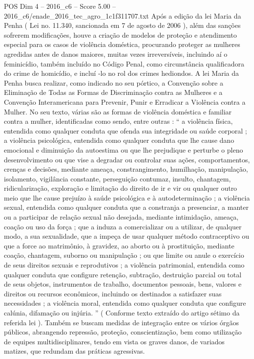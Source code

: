 \begin{textsample}{POS Dim 4 – 2016\_c6 – Score 5.00 – 2016\_c6/enade\_2016\_tec\_agro\_1c1f311707.txt}
Após a edição da lei Maria da Penha ( Lei no. 11.340, sancionada em 7 de agosto de 2006 ), além das sanções sofrerem modificações, houve a criação de modelos de proteção e atendimento especial para os casos de violência doméstica, procurando proteger as mulheres agredidas antes de danos maiores, muitas vezes irreversíveis, incluindo aí o feminicídio, também incluído no Código Penal, como circunstância qualificadora do crime de homicídio, e incluí -lo no rol dos crimes hediondos.
A lei Maria da Penha busca realizar, como indicado no seu pórtico, a Convenção sobre a Eliminação de Todas as Formas de Discriminação contra as Mulheres e a Convenção Interamericana para Prevenir, Punir e Erradicar a Violência contra a Mulher.
No seu texto, várias são as formas de violência doméstica e familiar contra a mulher, identificadas como sendo, entre outras : “ a violência física, entendida como qualquer conduta que ofenda sua integridade ou saúde corporal ; a violência psicológica, entendida como qualquer conduta que lhe cause dano emocional e diminuição da autoestima ou que lhe prejudique e perturbe o pleno desenvolvimento ou que vise a degradar ou controlar suas ações, comportamentos, crenças e decisões, mediante ameaça, constrangimento, humilhação, manipulação, isolamento, vigilância constante, perseguição contumaz, insulto, chantagem, ridicularização, exploração e limitação do direito de ir e vir ou qualquer outro meio que lhe cause prejuízo à saúde psicológica e à autodeterminação ; a violência sexual, entendida como qualquer conduta que a constranja a presenciar, a manter ou a participar de relação sexual não desejada, mediante intimidação, ameaça, coação ou uso da força ; que a induza a comercializar ou a utilizar, de qualquer modo, a sua sexualidade, que a impeça de usar qualquer método contraceptivo ou que a force ao matrimônio, à gravidez, ao aborto ou à prostituição, mediante coação, chantagem, suborno ou manipulação ; ou que limite ou anule o exercício de seus direitos sexuais e reprodutivos ; a violência patrimonial, entendida como qualquer conduta que configure retenção, subtração, destruição parcial ou total de seus objetos, instrumentos de trabalho, documentos pessoais, bens, valores e direitos ou recursos econômicos, incluindo os destinados a satisfazer suas necessidades ; a violência moral, entendida como qualquer conduta que configure calúnia, difamação ou injúria. ” ( Conforme texto extraído do artigo sétimo da referida lei ).
Também se buscam medidas de integração entre os vários órgãos públicos, abrangendo repressão, proteção, conscientização, bem como utilização de equipes multidisciplinares, tendo em vista os graves danos, de variados matizes, que redundam das práticas agressivas.

\end{textsample}
